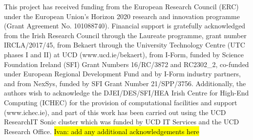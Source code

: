 \documentclass[sn-mathphys,Numbered]{sn-jnl}%
\begin{document}
\backmatter

This project has received funding from the European Research Council (ERC) under the European Union’s Horizon 2020 research and innovation programme (Grant Agreement No. 101088740).
Financial support is gratefully acknowledged from the Irish Research Council through the Laureate programme, grant number IRCLA/2017/45, from Bekaert through the University Technology Centre (UTC phases I and II) at UCD (www.ucd.ie/bekaert), from I-Form, funded by Science Foundation Ireland (SFI) Grant Numbers 16/RC/3872 and {RC2302\_2}, co-funded under European Regional Development Fund and by I-Form industry partners, and from NexSys, funded by SFI Grant Number 21/SPP/3756.
Additionally, the authors wish to acknowledge the DJEI/DES/SFI/HEA Irish Centre for High-End Computing (ICHEC) for the provision of computational facilities and support (www.ichec.ie), and part of this work has been carried out using the UCD ResearchIT Sonic cluster which was funded by UCD IT Services and the UCD Research Office.
\hl{Ivan: add any additional acknowledgements here}



\newpage

%
%
%
%


\end{document}
